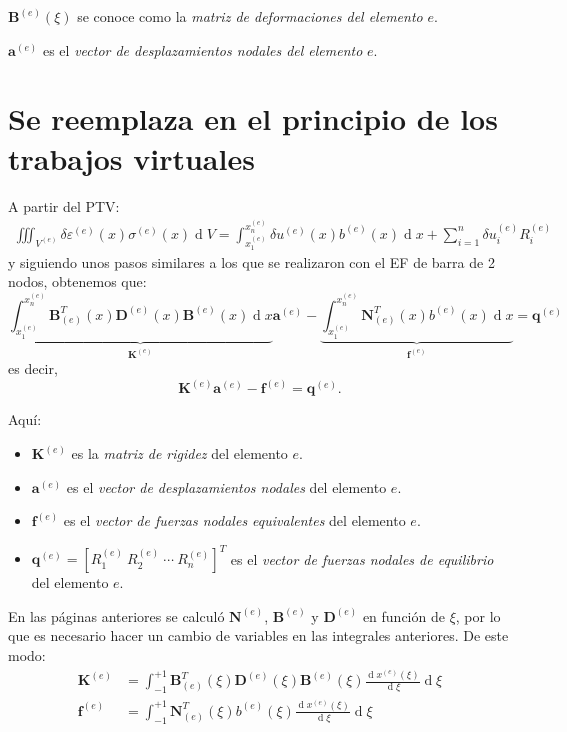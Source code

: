 \documentclass[12pt,letterpaper]{article}
\newcommand{\ve}[1]{{\boldsymbol{#1}}}
\newcommand{\ma}[1]{{\boldsymbol{#1}}}
\newcommand{\dd}{\operatorname{d} \!}
\begin{document}
$\ma{B}^{(e)}(\xi)$ se conoce como la \emph{matriz de deformaciones del elemento} $e$.

$\ve{a}^{(e)}$ es el \emph{vector de desplazamientos nodales del elemento} $e$.

\newpage
\section{Se reemplaza en el principio de los trabajos virtuales}

A partir del PTV:
\begin{align}
\iiint_{V^{(e)}} \delta\varepsilon^{(e)}(x) \sigma^{(e)}(x) \dd V = \int_{x_1^{(e)}}^{x_n^{(e)}} \delta u^{(e)}(x) b^{(e)}(x) \dd x + \sum_{i=1}^n \delta u_i^{(e)} R_i^{(e)}
\end{align}
y siguiendo unos pasos similares a los que se realizaron con el EF de barra de 2 nodos, obtenemos que:
\begin{equation}
\underbrace{\int_{x_1^{(e)}}^{x_n^{(e)}} \ma{B}_{(e)}^T(x) \ma{D}^{(e)}(x) \ma{B}^{(e)}(x) \dd x}_{\ma{K}^{(e)}} \ve{a}^{(e)} 
- \underbrace{\int_{x_1^{(e)}}^{x_n^{(e)}}  \ma{N}_{(e)}^T(x) b^{(e)}(x) \dd x}_{\ma{f}^{(e)}} 
= \ma{q}^{(e)}
\end{equation}
es decir,
\begin{equation}
\ma{K}^{(e)} \ve{a}^{(e)} - \ma{f}^{(e)} = \ma{q}^{(e)}.
\end{equation}

Aquí:
\begin{itemize}
    \item $\ma{K}^{(e)}$ es la \emph{matriz de rigidez} del elemento $e$.
    \item $\ve{a}^{(e)}$ es el \emph{vector de desplazamientos nodales} del elemento $e$.
    \item $\ma{f}^{(e)}$ es el \emph{vector de fuerzas nodales equivalentes} del elemento $e$.    
    \item $\ve{q}^{(e)} = [R_1^{(e)}\ R_2^{(e)}\ \cdots \ R_n^{(e)}]^T$ es el \emph{vector de fuerzas nodales de equilibrio} del elemento $e$.
\end{itemize}

En las páginas anteriores se calculó $\ma{N}^{(e)}$, $\ma{B}^{(e)}$ y $\ma{D}^{(e)}$ en función de $\xi$, por lo que es necesario hacer un cambio de variables en las integrales anteriores. De este modo:
\begin{align}
\ma{K}^{(e)} &= \int_{-1}^{+1} \ma{B}_{(e)}^T(\xi) \ma{D}^{(e)}(\xi) \ma{B}^{(e)}(\xi) \frac{\dd x^{(e)}(\xi)}{\dd \xi} \dd \xi\\
\ma{f}^{(e)} &= \int_{-1}^{+1}  \ma{N}_{(e)}^T(\xi) b^{(e)}(\xi) \frac{\dd x^{(e)}(\xi)}{\dd \xi} \dd \xi
\end{align}
\end{document}

